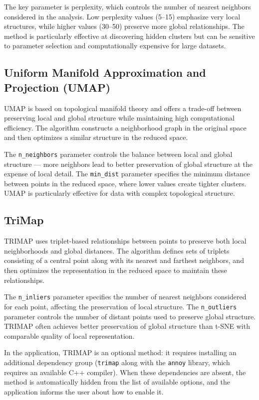 \documentclass[a4paper, 12pt]{article}
\begin{document}
The key parameter is perplexity, which controls the number of nearest neighbors considered in the analysis. Low perplexity values (5--15) emphasize very local structures, while higher values (30--50) preserve more global relationships. The method is particularly effective at discovering hidden clusters but can be sensitive to parameter selection and computationally expensive for large datasets.

\subsection{Uniform Manifold Approximation and Projection (UMAP)}

UMAP is based on topological manifold theory and offers a trade-off between preserving local and global structure while maintaining high computational efficiency. The algorithm constructs a neighborhood graph in the original space and then optimizes a similar structure in the reduced space.

The \texttt{n\_neighbors} parameter controls the balance between local and global structure --- more neighbors lead to better preservation of global structure at the expense of local detail. The \texttt{min\_dist} parameter specifies the minimum distance between points in the reduced space, where lower values create tighter clusters. UMAP is particularly effective for data with complex topological structure.

\subsection{TriMap}

TRIMAP uses triplet-based relationships between points to preserve both local neighborhoods and global distances. The algorithm defines sets of triplets consisting of a central point along with its nearest and farthest neighbors, and then optimizes the representation in the reduced space to maintain these relationships.

The \texttt{n\_inliers} parameter specifies the number of nearest neighbors considered for each point, affecting the preservation of local structure. The \texttt{n\_outliers} parameter controls the number of distant points used to preserve global structure. TRIMAP often achieves better preservation of global structure than t-SNE with comparable quality of local representation.

In the application, TRIMAP is an optional method: it requires installing an additional dependency group (\texttt{trimap} along with the \texttt{annoy} library, which requires an available C++ compiler). When these dependencies are absent, the method is automatically hidden from the list of available options, and the application informs the user about how to enable it.
\end{document}
